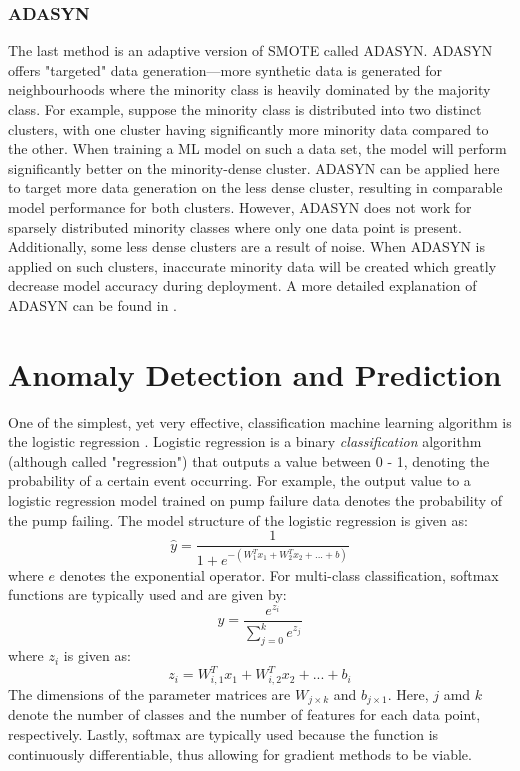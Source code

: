 \subsubsection{ADASYN}
The last method is an adaptive version of SMOTE called ADASYN. ADASYN offers "targeted" data generation---more synthetic data is generated for neighbourhoods where the minority class is heavily dominated by the majority class.  For example, suppose the minority class is distributed into two distinct clusters, with one cluster having significantly more minority data compared to the other.  When training a ML model on such a data set, the model will perform significantly better on the minority-dense cluster.  ADASYN can be applied here to target more data generation on the less dense cluster, resulting in comparable model performance for both clusters.  However, ADASYN does not work for sparsely distributed minority classes where only one data point is present.  Additionally, some less dense clusters are a result of noise.  When ADASYN is applied on such clusters, inaccurate minority data will be created which greatly decrease model accuracy during deployment. A more detailed explanation of ADASYN can be found in \cite{adasyn}.


\section{Anomaly Detection and Prediction}
One of the simplest, yet very effective, classification machine learning algorithm is the logistic regression \cite{log_reg}. Logistic regression is a binary \textit{classification} algorithm (although called "regression") that outputs a value between 0 - 1, denoting the probability of a certain event occurring.  For example, the output value to a logistic regression model trained on pump failure data denotes the probability of the pump failing. The model structure of the logistic regression is given as:
\begin{equation}
    \hat{y} = \frac{1}{1 + e^{-(W_1^Tx_1 + W_2^Tx_2 + ... + b)}}
    \label{eq:02LogS}
\end{equation}
where $e$ denotes the exponential operator.  For multi-class classification, softmax functions are typically used and are given by:
\begin{equation}
    y = \frac{e^{z_i}}{\sum\limits^k_{j=0}e^{z_j}}
    \label{eq:03softmax}
\end{equation}
where $z_i$ is given as:
$$z_i = W_{i, 1}^Tx_1 + W_{i, 2}^Tx_2 + ... + b_i$$
The dimensions of the parameter matrices are $W_{j \times k}$ and $b_{j \times 1}$.  Here, $j$ amd $k$ denote the number of classes and the number of features for each data point, respectively.  Lastly, softmax are typically used because the function is continuously differentiable, thus allowing for gradient methods to be viable.

